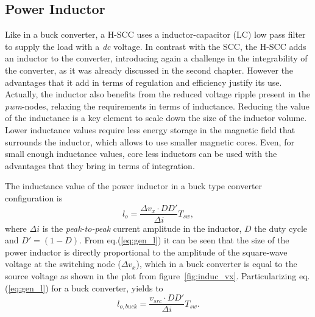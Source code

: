 \subsection{Power Inductor}
\label{ch:power_inductor}

Like in a buck converter, a H-SCC uses a inductor-capacitor (LC) low pass filter to supply the load with a \emph{dc} voltage. In contrast with the SCC, the H-SCC adds an inductor to the converter, introducing again a challenge in the integrability of the converter, as it was already discussed in the second chapter. However the advantages that it add in terms of regulation and efficiency justify its use. Actually, the inductor also benefits from the reduced voltage ripple present in the \emph{pwm}-nodes, relaxing the requirements in terms of inductance. Reducing the value of the inductance is a key element to scale down the size of the inductor volume. Lower inductance values require less energy storage in the magnetic field that surrounds the inductor, which allows to use smaller magnetic cores. Even, for small enough inductance values, core less inductors can be used with the advantages that they bring in terms of integration.

The inductance value of the power inductor in a buck type converter configuration is
\begin{equation}
 l_{o}   = \frac{\Delta v_{x} \cdot DD'}{\Delta i} T_{sw},
\label{eq:gen_l}
\end{equation}
where $\Delta i$ is the \emph{peak-to-peak} current amplitude in the inductor, $D$ the duty cycle and $D'=(1-D)$. From eq.(\ref{eq:gen_l}) it can be seen that the size of the power inductor is directly proportional to the amplitude of the square-wave voltage at the switching node ($\Delta v_x$), which in a buck converter is equal to the source voltage as shown in the plot from figure~\ref{fig:induc_vx}. Particularizing eq.(\ref{eq:gen_l}) for a buck converter, yields to
\begin{equation}
 l_{o,buck}  = \frac{v_{src} \cdot DD'}{\Delta i} T_{sw}.
\label{eq:buck_l}
\end{equation}

